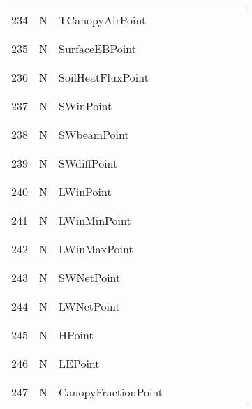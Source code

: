 \begin{longtable}{|c|c|l|c|c|c|c|p{}|c|p{}|}
&&&&&&&&&\\\hline%
&&&&&&&&&\\
234 & N & TCanopyAirPoint & & & & & & & \\
&&&&&&&&&\\\hline%
&&&&&&&&&\\
235 & N & SurfaceEBPoint & & & & & & & \\
&&&&&&&&&\\\hline%
&&&&&&&&&\\
236 & N & SoilHeatFluxPoint & & & & & & & \\
&&&&&&&&&\\\hline%
&&&&&&&&&\\
237 & N & SWinPoint & & & & & & & \\
&&&&&&&&&\\\hline%
&&&&&&&&&\\
238 & N & SWbeamPoint & & & & & & & \\
&&&&&&&&&\\\hline%
&&&&&&&&&\\
239 & N & SWdiffPoint & & & & & & & \\
&&&&&&&&&\\\hline%
&&&&&&&&&\\
240 & N & LWinPoint & & & & & & & \\
&&&&&&&&&\\\hline%
&&&&&&&&&\\
241 & N & LWinMinPoint & & & & & & & \\
&&&&&&&&&\\\hline%
&&&&&&&&&\\
242 & N & LWinMaxPoint & & & & & & & \\
&&&&&&&&&\\\hline%
&&&&&&&&&\\
243 & N & SWNetPoint & & & & & & & \\
&&&&&&&&&\\\hline%
&&&&&&&&&\\
244 & N & LWNetPoint & & & & & & & \\
&&&&&&&&&\\\hline%
&&&&&&&&&\\
245 & N & HPoint & & & & & & & \\
&&&&&&&&&\\\hline%
&&&&&&&&&\\
246 & N & LEPoint & & & & & & & \\
&&&&&&&&&\\\hline%
&&&&&&&&&\\
247 & N & CanopyFractionPoint & & & & & & & \\

\end{longtable}
